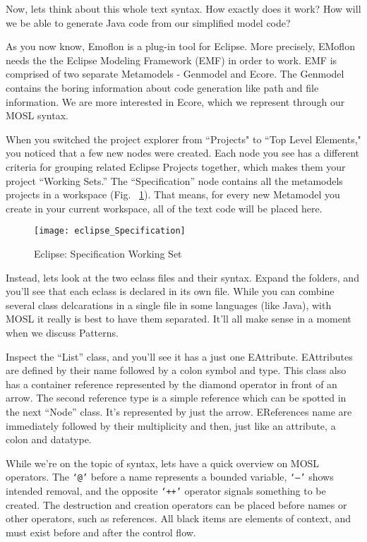\newpage
\texHeader

Now,\hypertarget{projectStructure tex}{} lets think about this whole text syntax. How exactly does it work? How will we be able to generate Java code from our simplified model code?

As you now know, Emoflon is a plug-in tool for Eclipse. More precisely, EMoflon needs the the Eclipse Modeling Framework (EMF) in order to work. EMF is comprised of two separate Metamodels - Genmodel and Ecore. The Genmodel contains the boring information about code generation like path and file information. 
We are more interested in Ecore, which we represent through our MOSL syntax. 

When you switched the project explorer from ``Projects" to ``Top Level Elements," you noticed that a few new nodes were created. Each node you see has a different criteria for grouping related Eclipse Projects together, which makes them your project ``Working Sets.'' The ``Specification'' node contains all the metamodels projects in a workspace (Fig. ~\ref{fig_modelSpecification}). That means, for every new Metamodel you create in your current workspace, all of the text code will be placed here. 

 \begin{figure}[htbp]
  \centering
  \texttt{[image: eclipse\_Specification]}
  \caption{Eclipse: Specification Working Set}
  \label{fig_modelSpecification}
\end{figure}
  

Instead, lets look at the two eclass files and their syntax. Expand the folders, and you'll see that each eclass is declared in its own file. While you can combine several class delcarations in a single file in some languages (like Java), with MOSL it really is best to have them separated. It'll all make sense in a moment when we discuss Patterns.

Inspect the ``List'' class, and you'll see it has a just one EAttribute. EAttributes are defined by their name followed by a colon symbol and type.
This class also has a container reference represented by the diamond operator in front of an arrow.
The second reference type is a simple reference which
%
can be spotted in the next ``Node'' class. It's represented by just the arrow. EReferences name are immediately followed by their multiplicity %
and then, just like an attribute, a colon and datatype.

While we're on the topic of syntax, lets have a quick overview on MOSL operators. The \texttt{`@'} before a name represents a bounded variable, \texttt{`--'} shows intended removal, and the opposite \texttt{`++'} operator signals something to be created. The destruction and creation operators can be placed before names or other operators, such as references.  All black items are elements of context, and must exist before and after the control flow. 

